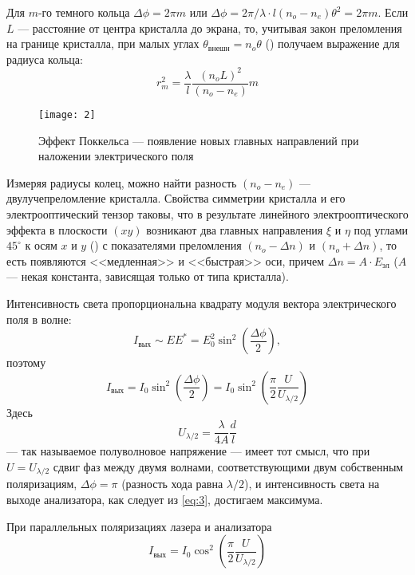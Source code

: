 \documentclass[a4paper, 12pt]{article}
\begin{document}
Для $m$-го темного кольца $\Delta \phi = 2\pi m$ или $\Delta \phi =
2\pi/\lambda \cdot l (n_o-n_e)\theta^2 = 2\pi m$. Если $L$ ---
расстояние от центра кристалла до экрана, то, учитывая закон
преломления на границе кристалла, при малых углах $\theta_\text{внешн}
= n_o \theta$ () получаем выражение для радиуса кольца:
\begin{equation}
    r_m^2 = \frac{\lambda}{l} \frac{(n_o L)^2}{(n_o-n_e)} m
    \label{eq:2}
\end{equation}

\begin{wrapfigure}{r}{0.4\linewidth}
    \texttt{[image: 2]}
    \caption{Эффект Поккельса --- появление новых главных направлений
    при наложении электрического поля}
    \label{fig:2}
\end{wrapfigure}

Измеряя радиусы колец, можно найти разность $(n_o-n_e)$ ---
двулучепреломление кристалла. Свойства симметрии кристалла и его
электрооптический тензор таковы, что в результате линейного
электрооптического эффекта в плоскости $(xy)$ возникают два главных
направления $\xi$ и $\eta$ под углами $45^\circ$ к осям $x$ и $y$
() с показателями преломления $(n_o-\Delta n)$ и $(n_o+
\Delta n)$, то есть появляются <<медленная>> и <<быстрая>> оси, причем
$\Delta n = A \cdot E_\text{эл}$ ($A$ --- некая константа, зависящая
только от типа кристалла).

Интенсивность света пропорциональна
квадрату модуля вектора электрического поля в волне:
\[
    I_\text{вых} \sim EE^{*} = E_0^2\sin^2 \left( \frac{\Delta \phi}{2}
        \right),
\]
поэтому 
\begin{equation}
    I_\text{вых} = I_0 \sin^2 \left( \frac{\Delta \phi}{2}\right) =
    I_0 \sin^2 \left( \frac{\pi}{2} \frac{U}{U_{\lambda/2}}\right) 
    \label{eq:3}
\end{equation}
Здесь
\begin{equation}
    U_{\lambda/2} = \frac{\lambda}{4 A} \frac{d}{l}
    \label{eq:4}
\end{equation}
--- так называемое полуволновое напряжение --- имеет тот смысл, что
при $U = U_{\lambda/2}$ сдвиг фаз между двумя волнами,
соответствующими двум собственным поляризациям, $\Delta \phi = \pi$
(разность хода равна $\lambda/2$), и интенсивность света на выходе
анализатора, как следует из \eqref{eq:3}, достигаем максимума.

При параллельных поляризациях лазера и анализатора 
\begin{equation}
    I_\text{вых} = I_0 \cos^2 \left( \frac{\pi}{2}
    \frac{U}{U_{\lambda/2}} \right)
    \label{eq:5}
\end{equation}
\end{document}
